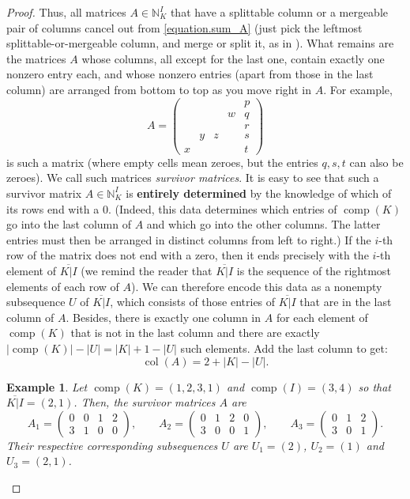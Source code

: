 \documentclass[revision]{FPSAC2025}
\newtheorem{example}{Example}
\newcommand{\NN}{\mathbb{N}} %
\newcommand{\comp}{\operatorname{comp}}
\newcommand{\col}{\operatorname{col}}
\begin{document}
\begin{proof}
Thus, all matrices $A \in \NN^{I}_K$ that have a splittable column
or a mergeable pair of columns cancel out from \eqref{equation.sum_A}
(just pick the leftmost splittable-or-mergeable column, and
merge or split it, as in \cite[proof of Theorem 2.2.2]{Sag20}).
What remains are the matrices $A$ whose
columns, all except for the last one, contain exactly one nonzero entry each,
and whose nonzero entries (apart from those in the last column)
are arranged from bottom to top as you move right in $A$. For example,
\[
A = \begin{pmatrix}
&  &  &  & p\\
&  &  & w & q\\
&  &  &  & r\\
& y & z &  & s\\
x &  &  &  & t
\end{pmatrix}
\]
is such a matrix (where empty cells mean zeroes, but the entries $q,s,t$ can also be zeroes). We call such matrices \emph{survivor matrices}. It is easy to see that such a survivor matrix $A \in \mathbb{N}^{I}_K$ is \textbf{entirely determined} by the knowledge of which of its rows end with a $0$.
(Indeed, this data determines which entries of $\comp(K)$ go into the last column of $A$ and which go into the other columns. The latter entries must then be arranged in distinct columns from left to right.)
If the $i$-th row of the matrix does not end with a zero, then it ends precisely with the $i$-th element of $\overline{K|I}$ (we remind the reader that $\overline{ K|I}$ is the sequence of the rightmost elements of each row of $A$). We can therefore encode this data as a nonempty subsequence $U$ of $\overline{K|I}$, which consists of those entries of $\overline{K|I}$ that are in the last column of $A$. Besides, there is exactly one column in $A$ for each element of $\comp(K)$ that is not in the last column and there are exactly $|\comp(K)| - |U| = |K|+1-|U|$ such elements. Add the last column to get:
\begin{equation}
\label{equation.colA}
\col(A) = 2 + |K| - |U|.
\end{equation}

\begin{example}
Let $\comp(K) = (1,2,3,1)$ and $\comp(I) = (3, 4)$ so that $\overline{ K|I} = (2,1)$. Then, the survivor matrices $A$ are
\[
A_1 = \begin{pmatrix}
0&0  &1  &2 \\
3&1  &0  & 0
\end{pmatrix},
\qquad
A_2 = \begin{pmatrix}
0&1  &2  &0 \\
3&0  &0  & 1
\end{pmatrix},
\qquad
A_3 = \begin{pmatrix}
0&1  &2 \\
3&0  & 1
\end{pmatrix}.
\]
Their respective corresponding subsequences $U$ are $U_1 = (2)$, $U_2 = (1)$ and $U_3 =  (2,1)$.
\end{example}


\end{proof}
\end{document}
